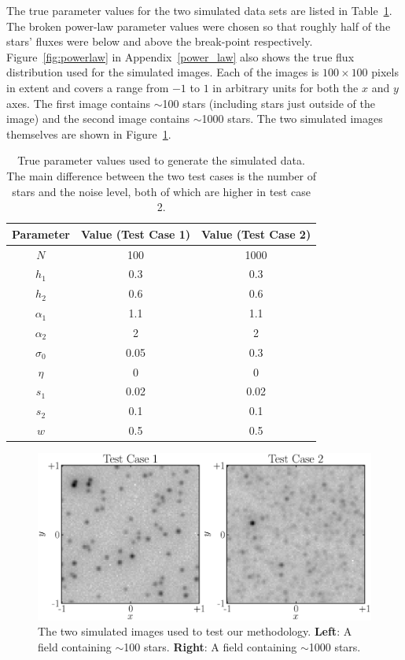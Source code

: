 \documentclass[12pt, preprint]{aastex}
\begin{document}
The true parameter values for the two simulated data sets are listed in
Table~\ref{tab:truth}. The broken power-law parameter values were chosen so that
roughly half of the stars' fluxes were below and above the break-point
respectively. Figure~\ref{fig:powerlaw} in Appendix~\ref{power_law} also shows the true flux distribution
used for the simulated images. Each of the images
is $100 \times 100$ pixels in extent and covers a range from $-1$ to $1$ in
arbitrary units for both the $x$ and $y$ axes. The first image contains
$\sim$100 stars (including stars just outside of the image) and the second
image contains $\sim$1000 stars. The two simulated images themselves
are shown in Figure~\ref{fig:simulated_data}.

\begin{table}\footnotesize
\begin{center}
\begin{tabular}{|c|c|c|}
\hline
Parameter & Value (Test Case 1) & Value (Test Case 2)\\
\hline
$N$ & 100 & 1000\\
$h_1$ & 0.3 & 0.3\\
$h_2$ & 0.6 & 0.6\\
$\alpha_1$ & 1.1 & 1.1\\
$\alpha_2$ & 2 & 2\\
\hline
$\sigma_0$ & 0.05 & 0.3\\
$\eta$ & 0 & 0 \\
$s_1$ & 0.02 & 0.02\\
$s_2$ & 0.1 & 0.1\\
$w$ & 0.5 & 0.5\\
\hline
\end{tabular}
\end{center}
\caption{True parameter values used to generate the simulated data. The main
difference between the two test cases is the number of stars and the noise
level, both of which are higher in test case 2.
\label{tab:truth}}
\end{table}

\begin{figure}[ht!]
\begin{center}
\includegraphics[width=\textwidth]{Figures/test_cases.eps}
\caption{The two simulated images used to test our methodology.
{\bf Left}: A field containing $\sim$100 stars.
{\bf Right}: A field containing $\sim$1000 stars.\label{fig:simulated_data}}
\end{center}
\end{figure}
\end{document}
